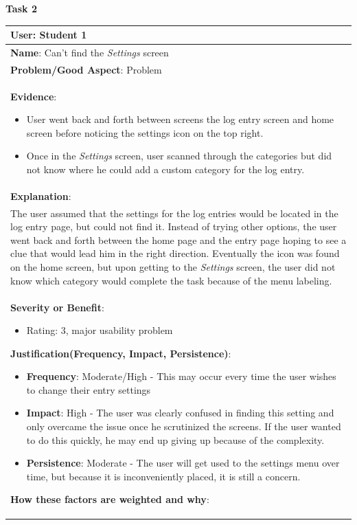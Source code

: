 \documentclass[pdftex,12pt,a4paper]{report}
\begin{document}
\textbf{Task 2}
\begin{center}
	\begin{longtable}{|p{\textwidth}|}
	\hline
	\textbf{User}: Student 1\\
	\hline
	\textbf{Name}: Can't find the \emph{Settings} screen\\
	\hline
	\textbf{Problem/Good Aspect}: Problem\\
	\hline
	\textbf{Evidence}:
	\begin{itemize}
	\item{User went back and forth between screens the log entry screen and home screen before noticing the settings icon on the top right.}
	\item{Once in the \emph{Settings} screen, user scanned through the categories but did not know where he could add a custom category for the log entry.}
	\end{itemize}\\
	\hline
	\textbf{Explanation}:\\The user assumed that the settings for the log entries would be located in the log entry page, but could not find it. Instead of trying other options, the user went back and forth between the home page and the entry page hoping to see a clue that would lead him in the right direction. Eventually the icon was found on the home screen, but upon getting to the \emph{Settings} screen, the user did not know which category would complete the task because of the menu labeling.\\
	\hline
\textbf{Severity or Benefit}:
	\begin{itemize}
	\item{Rating: 3, major usability problem}
	\end{itemize}
	\textbf{Justification(Frequency, Impact, Persistence)}:
	\begin{itemize}
	\item{\textbf{Frequency}:} Moderate/High - This may occur every time the user wishes to change their entry settings
	\item{\textbf{Impact}:} High - The user was clearly confused in finding this setting and only overcame the issue once he scrutinized the screens. If the user wanted to do this quickly, he may end up giving up because of the complexity. 
	\item{\textbf{Persistence}:} Moderate - The user will get used to the settings menu over time, but because it is inconveniently placed, it is still a concern.
	\end{itemize}
	\textbf{How these factors are weighted and why}:\\

\end{longtable}
\end{center}
\end{document}
